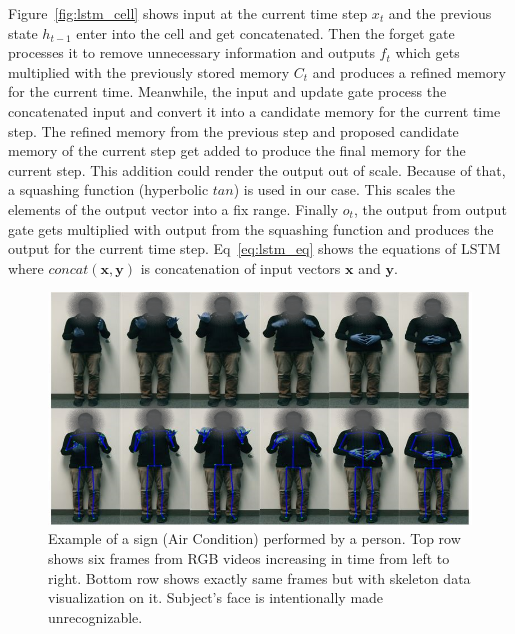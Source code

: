 \documentclass[10pt,twocolumn,letterpaper]{article}
\begin{document}
Figure~\ref{fig:lstm_cell} shows input at the current time step $x_t$ and the 
previous state $h_{t-1}$ enter into the cell and get concatenated. Then the forget gate processes it to remove
unnecessary information and outputs $f_t$ which gets multiplied with the previously 
stored memory $C_t$ and produces a refined memory for the current time. Meanwhile, the input 
and  update gate process the concatenated input and convert it into a candidate memory for the current time step. The refined memory from the previous step and proposed candidate memory of the current step get added to produce the final memory for the current step. This addition could render the output out of scale. Because of that, a squashing function (hyperbolic $tan$) is used 
in our case. This scales the elements of the output vector into a fix range. Finally $o_t$, the output 
from output gate gets multiplied with output from the squashing function and produces the output for the current time step. Eq~\ref{eq:lstm_eq} shows the equations of LSTM where $concat(\mathbf{x},\mathbf{y})$ is 
concatenation of input vectors $\mathbf{x}$ and $\mathbf{y}$.

\begin{figure}
	\begin{center}
		\includegraphics[width=.8\linewidth]{ac_person1_faceoff}
	\end{center}
	\caption{Example of a sign (Air Condition) performed by a person. Top row shows six frames from RGB videos increasing in time from left to right. Bottom row shows exactly same frames but with skeleton data visualization on it. Subject's face is intentionally made unrecognizable.}
	\label{fig:ac_person1}
\end{figure}
\end{document}
